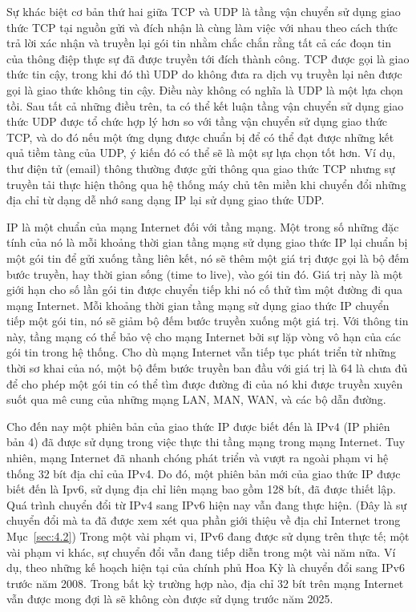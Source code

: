 Sự khác biệt cơ bản thứ hai giữa TCP và UDP là tầng vận chuyển sử dụng giao thức TCP tại
nguồn gửi và đích nhận là cùng làm việc với nhau theo cách thức trả lời xác nhận và truyền
lại gói tin nhằm chắc chắn rằng tất cả các đoạn tin của thông điệp thực sự đã được truyền
tới đích thành công. TCP được gọi là giao thức tin cậy, trong khi đó thì UDP do không đưa
ra dịch vụ truyền lại nên được gọi là giao thức không tin cậy. Điều này không có nghĩa là
UDP là một lựa chọn tồi. Sau tất cả những điều trên, ta có thể kết luận tầng vận
chuyển sử dụng giao thức UDP được tổ chức hợp lý hơn so với tầng vận chuyển sử dụng giao
thức TCP, và do đó nếu một ứng dụng được chuẩn bị để có thể đạt được những kết quả tiềm
tàng của UDP, ý kiến đó có thể sẽ là một sự lựa chọn tốt hơn. Ví dụ, thư điện tử (email)
thông thường được gửi thông qua giao thức TCP nhưng sự truyền tải thực hiện thông qua hệ
thống máy chủ tên miền khi chuyển đổi những địa chỉ từ dạng dễ nhớ sang dạng IP lại sử
dụng giao thức UDP.

IP là một chuẩn của mạng Internet đối với tầng mạng. Một trong số những đặc tính của nó là
mỗi khoảng thời gian tầng mạng sử dụng giao thức IP lại chuẩn bị một gói tin để gửi xuống
tầng liên kết, nó sẽ thêm một giá trị được gọi là bộ đếm bước truyền, hay thời gian sống
(time to live), vào gói tin đó. Giá trị này là một giới hạn cho số lần gói tin được chuyển
tiếp khi nó cố thử tìm một đường đi qua mạng Internet. Mỗi khoảng thời gian tầng mạng sử
dụng giao thức IP chuyển tiếp một gói tin, nó sẽ giảm bộ đếm bước truyền xuống một giá
trị. Với thông tin này, tầng mạng có thể bảo vệ cho mạng Internet bởi sự lặp vòng vô hạn
của các gói tin trong hệ thống. Cho dù mạng Internet vẫn tiếp tục phát triển từ những thời
sơ khai của nó, một bộ đếm bước truyền ban đầu với giá trị là 64 là chưa đủ để cho phép
một gói tin có thể tìm được đường đi của nó khi được truyền xuyên suốt qua mê cung của
những mạng LAN, MAN, WAN, và các bộ dẫn đường.

Cho đến nay một phiên bản của giao thức IP được biết đến là IPv4 (IP phiên bản 4) đã được
sử dụng trong việc thực thi tầng mạng trong mạng Internet. Tuy nhiên, mạng Internet đã
nhanh chóng phát triển và vượt ra ngoài phạm vi hệ thống 32 bít địa chỉ của IPv4. Do đó,
một phiên bản mới của giao thức IP được biết đến là Ipv6, sử dụng địa chỉ liên mạng bao
gồm 128 bít, đã được thiết lập. Quá trình chuyển đổi từ IPv4 sang IPv6 hiện nay vẫn đang
thực hiện. (Đây là sự chuyển đổi mà ta đã được xem xét qua phần giới thiệu về địa
chỉ Internet trong Mục~\ref{sec:4.2}) Trong một vài phạm vi, IPv6 đang được sử dụng trên thực tế;
một vài phạm vi khác, sự chuyển đổi vẫn đang tiếp diễn trong một vài năm nữa. Ví dụ, theo
những kế hoạch hiện tại của chính phủ Hoa Kỳ là chuyển đổi sang IPv6 trước năm 2008. Trong
bất kỳ trường hợp nào, địa chỉ 32 bít trên mạng Internet vẫn được mong đợi là sẽ không còn
được sử dụng trước năm 2025.


